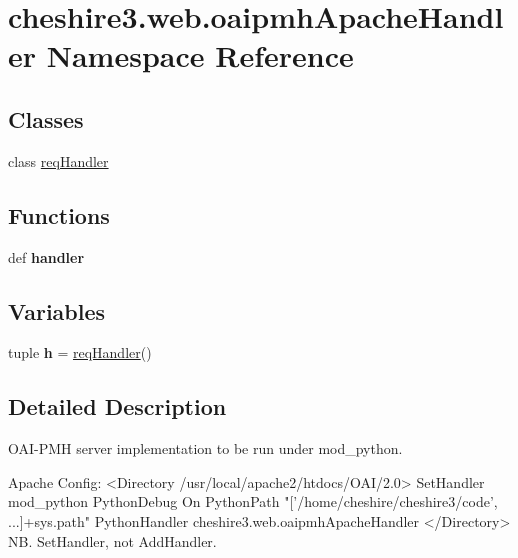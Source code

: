 \hypertarget{namespacecheshire3_1_1web_1_1oaipmh_apache_handler}{\section{cheshire3.\-web.\-oaipmh\-Apache\-Handler Namespace Reference}
\label{namespacecheshire3_1_1web_1_1oaipmh_apache_handler}
}
\subsection*{Classes}
\begin{DoxyCompactItemize}
\item 
class \hyperlink{classcheshire3_1_1web_1_1oaipmh_apache_handler_1_1req_handler}{req\-Handler}
\end{DoxyCompactItemize}
\subsection*{Functions}
\begin{DoxyCompactItemize}
\item 
\hypertarget{namespacecheshire3_1_1web_1_1oaipmh_apache_handler_a024d44e48ed86679a973af6df761f4fa}{def {\bfseries handler}}\label{namespacecheshire3_1_1web_1_1oaipmh_apache_handler_a024d44e48ed86679a973af6df761f4fa}

\end{DoxyCompactItemize}
\subsection*{Variables}
\begin{DoxyCompactItemize}
\item 
\hypertarget{namespacecheshire3_1_1web_1_1oaipmh_apache_handler_ab542aa62d501642e2b3334a39fd81770}{tuple {\bfseries h} = \hyperlink{classcheshire3_1_1web_1_1oaipmh_apache_handler_1_1req_handler}{req\-Handler}()}\label{namespacecheshire3_1_1web_1_1oaipmh_apache_handler_ab542aa62d501642e2b3334a39fd81770}

\end{DoxyCompactItemize}


\subsection{Detailed Description}
\begin{DoxyVerb}OAI-PMH server implementation to be run under mod_python.

 Apache Config:
<Directory /usr/local/apache2/htdocs/OAI/2.0>
  SetHandler mod_python
  PythonDebug On
  PythonPath "['/home/cheshire/cheshire3/code', ...]+sys.path"
  PythonHandler cheshire3.web.oaipmhApacheHandler
</Directory>
NB. SetHandler, not AddHandler.\end{DoxyVerb}
 